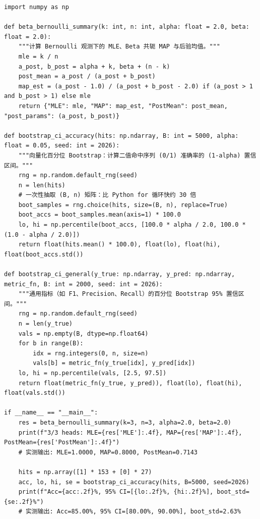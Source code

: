 \begin{lstlisting}[caption={纯 NumPy 实现 Beta-Bernoulli 共轭更新与向量化百分位 Bootstrap 置信区间}, label={lst:ch5-beta-bootstrap}]
import numpy as np

def beta_bernoulli_summary(k: int, n: int, alpha: float = 2.0, beta: float = 2.0):
    """计算 Bernoulli 观测下的 MLE、Beta 共轭 MAP 与后验均值。"""
    mle = k / n
    a_post, b_post = alpha + k, beta + (n - k)
    post_mean = a_post / (a_post + b_post)
    map_est = (a_post - 1.0) / (a_post + b_post - 2.0) if (a_post > 1 and b_post > 1) else mle
    return {"MLE": mle, "MAP": map_est, "PostMean": post_mean, "post_params": (a_post, b_post)}

def bootstrap_ci_accuracy(hits: np.ndarray, B: int = 5000, alpha: float = 0.05, seed: int = 2026):
    """向量化百分位 Bootstrap：计算二值命中序列 (0/1) 准确率的 (1-alpha) 置信区间。"""
    rng = np.random.default_rng(seed)
    n = len(hits)
    # 一次性抽取 (B, n) 矩阵：比 Python for 循环快约 30 倍
    boot_samples = rng.choice(hits, size=(B, n), replace=True)
    boot_accs = boot_samples.mean(axis=1) * 100.0
    lo, hi = np.percentile(boot_accs, [100.0 * alpha / 2.0, 100.0 * (1.0 - alpha / 2.0)])
    return float(hits.mean() * 100.0), float(lo), float(hi), float(boot_accs.std())

def bootstrap_ci_general(y_true: np.ndarray, y_pred: np.ndarray, metric_fn, B: int = 2000, seed: int = 2026):
    """通用指标（如 F1、Precision、Recall）的百分位 Bootstrap 95% 置信区间。"""
    rng = np.random.default_rng(seed)
    n = len(y_true)
    vals = np.empty(B, dtype=np.float64)
    for b in range(B):
        idx = rng.integers(0, n, size=n)
        vals[b] = metric_fn(y_true[idx], y_pred[idx])
    lo, hi = np.percentile(vals, [2.5, 97.5])
    return float(metric_fn(y_true, y_pred)), float(lo), float(hi), float(vals.std())

if __name__ == "__main__":
    res = beta_bernoulli_summary(k=3, n=3, alpha=2.0, beta=2.0)
    print(f"3/3 heads: MLE={res['MLE']:.4f}, MAP={res['MAP']:.4f}, PostMean={res['PostMean']:.4f}")
    # 实测输出: MLE=1.0000, MAP=0.8000, PostMean=0.7143

    hits = np.array([1] * 153 + [0] * 27)
    acc, lo, hi, se = bootstrap_ci_accuracy(hits, B=5000, seed=2026)
    print(f"Acc={acc:.2f}%, 95% CI=[{lo:.2f}%, {hi:.2f}%], boot_std={se:.2f}%")
    # 实测输出: Acc=85.00%, 95% CI=[80.00%, 90.00%], boot_std=2.63%
\end{lstlisting}

